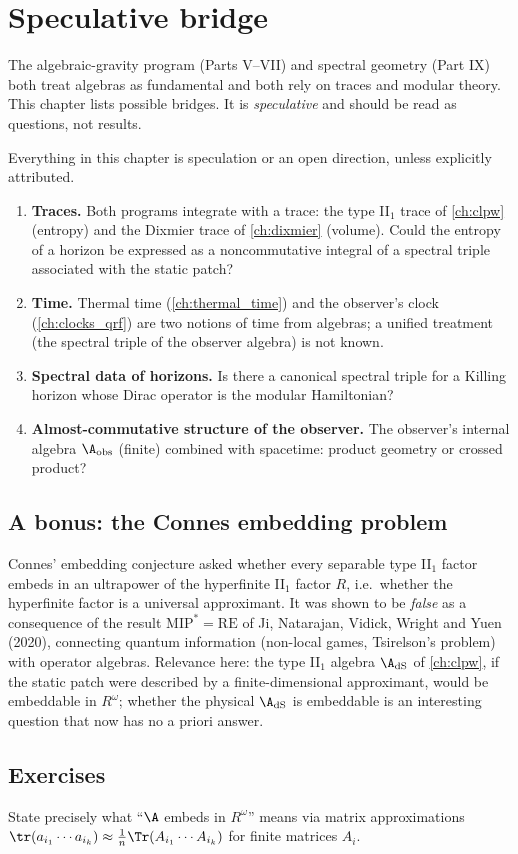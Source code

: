 \chapter{Speculative bridge}\label{ch:bridge}
\skippable

\begin{physmotiv}
The algebraic-gravity program (Parts V--VII) and spectral geometry (Part IX) both treat algebras as fundamental and both rely on traces and modular theory. This chapter lists possible bridges. It is \emph{speculative} and should be read as questions, not results.
\end{physmotiv}

\begin{unsettled}
Everything in this chapter is speculation or an open direction, unless explicitly attributed.
\end{unsettled}

\begin{enumerate}
\item \textbf{Traces.} Both programs integrate with a trace: the type II$_1$ trace of \cref{ch:clpw} (entropy) and the Dixmier trace of \cref{ch:dixmier} (volume). Could the entropy of a horizon be expressed as a noncommutative integral of a spectral triple associated with the static patch?
\item \textbf{Time.} Thermal time (\cref{ch:thermal_time}) and the observer's clock (\cref{ch:clocks_qrf}) are two notions of time from algebras; a unified treatment (the spectral triple of the observer algebra) is not known.
\item \textbf{Spectral data of horizons.} Is there a canonical spectral triple for a Killing horizon whose Dirac operator is the modular Hamiltonian?
\item \textbf{Almost-commutative structure of the observer.} The observer's internal algebra $\A_{\rm obs}$ (finite) combined with spacetime: product geometry or crossed product?
\end{enumerate}

\section*{A bonus: the Connes embedding problem}
Connes' embedding conjecture asked whether every separable type II$_1$ factor embeds in an ultrapower of the hyperfinite II$_1$ factor $R$, i.e.\ whether the hyperfinite factor is a universal approximant. It was shown to be \emph{false} as a consequence of the result $\mathrm{MIP}^*=\mathrm{RE}$ of Ji, Natarajan, Vidick, Wright and Yuen (2020), connecting quantum information (non-local games, Tsirelson's problem) with operator algebras. Relevance here: the type II$_1$ algebra $\A_{\rm dS}$ of \cref{ch:clpw}, if the static patch were described by a finite-dimensional approximant, would be embeddable in $R^\omega$; whether the physical $\A_{\rm dS}$ is embeddable is an interesting question that now has no a priori answer.

\section*{Exercises}
\begin{exercise}
State precisely what ``$\A$ embeds in $R^\omega$'' means via matrix approximations $\tr(a_{i_1}\cdots a_{i_k})\approx\frac1{n}\Tr(A_{i_1}\cdots A_{i_k})$ for finite matrices $A_i$.
\end{exercise}
